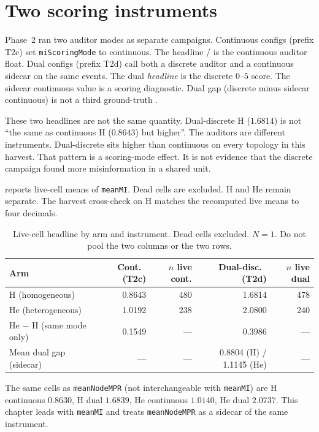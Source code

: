\section{Two scoring instruments}
\label{sec:instruments}

Phase~2 ran two auditor modes as separate campaigns.
Continuous configs (prefix T2c) set \texttt{miScoringMode} to continuous.
The headline \MI{}/\MPR{} is the continuous auditor float.
Dual configs (prefix T2d) call both a discrete auditor and a continuous sidecar on the same events.
The dual \emph{headline} is the discrete $0$--$5$ score.
The sidecar continuous value is a scoring diagnostic.
Dual gap (discrete minus sidecar continuous) is not a third ground-truth \MPR{}.

These two headlines are not the same quantity.
Dual-discrete H ($1.6814$) is not \enquote{the same \MPR{} as continuous H ($0.8643$) but higher}.
The auditors are different instruments.
Dual-discrete sits higher than continuous on every topology in this harvest.
That pattern is a scoring-mode effect.
It is not evidence that the discrete campaign found more misinformation in a shared unit.

 reports live-cell means of \texttt{meanMI}.
Dead cells are excluded.
H and He remain separate.
The harvest cross-check on H matches the recomputed live means to four decimals.

\begin{table}[t]
\centering
\caption{Live-cell headline \MPR{} by arm and instrument.
Dead cells excluded.
$N=1$.
Do not pool the two columns or the two rows.}
\label{tab:headlines}
\begin{threeparttable}
\small
\begin{tabular}{lrrrr}
\toprule
Arm & Cont.\ \MPR{} (T2c) & $n$ live cont. & Dual-disc.\ \MPR{} (T2d) & $n$ live dual \\
\midrule
H (homogeneous) & 0.8643 & 480 & 1.6814 & 478 \\
He (heterogeneous) & 1.0192 & 238 & 2.0800 & 240 \\
\midrule
He $-$ H (same mode only) & 0.1549 & --- & 0.3986 & --- \\
Mean dual gap (sidecar) & --- & --- & 0.8804 (H) / 1.1145 (He) & --- \\
\bottomrule
\end{tabular}
\end{threeparttable}
\end{table}

The same cells as \texttt{meanNodeMPR} (not interchangeable with \texttt{meanMI}) are H continuous $0.8630$, H dual $1.6839$, He continuous $1.0140$, He dual $2.0737$.
This chapter leads with \texttt{meanMI} and treats \texttt{meanNodeMPR} as a sidecar of the same instrument.

